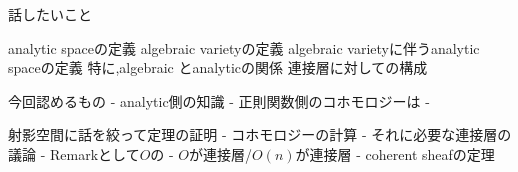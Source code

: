 話したいこと

analytic spaceの定義
algebraic varietyの定義
algebraic varietyに伴うanalytic spaceの定義
特に,algebraic とanalyticの関係
連接層に対しての構成


今回認めるもの
- analytic側の知識
  - 正則関数側のコホモロジーは 
- 

射影空間に話を絞って定理の証明
- コホモロジーの計算
- それに必要な連接層の議論
- Remarkとして$O$の
- $O$が連接層/$O(n)$が連接層
- 
coherent sheafの定理